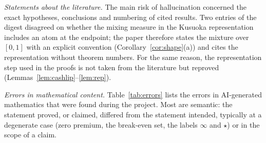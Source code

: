 \emph{Statements about the literature.} The main risk of hallucination concerned the exact hypotheses, conclusions
and numbering of cited results. Two entries of the digest disagreed on whether the mixing measure in the Kusuoka
representation includes an atom at the endpoint; the paper therefore states the mixture over $[0,1]$ with an
explicit convention (Corollary~\ref{cor:shape}(a)) and cites the representation without theorem numbers. For the
same reason, the representation step used in the proofs is not taken from the literature but reproved
(Lemmas~\ref{lem:cashlip}--\ref{lem:rep}).

\emph{Errors in mathematical content.} Table~\ref{tab:errors} lists the errors in AI-generated mathematics that were
found during the project. Most are semantic: the statement proved, or claimed, differed from the statement
intended, typically at a degenerate case (zero premium, the break-even set, the labels $\infty$ and $\star$) or in
the scope of a claim.

